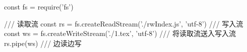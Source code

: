 const fs = require('fs')

/// 读取流
const rs = fs.createReadStream('./rwIndex.js', 'utf-8')
/// 写入流
const ws = fs.createWriteStream('./1.tex', 'utf-8')
/// 将读取流送入写入流
rs.pipe(ws) /// 边读边写